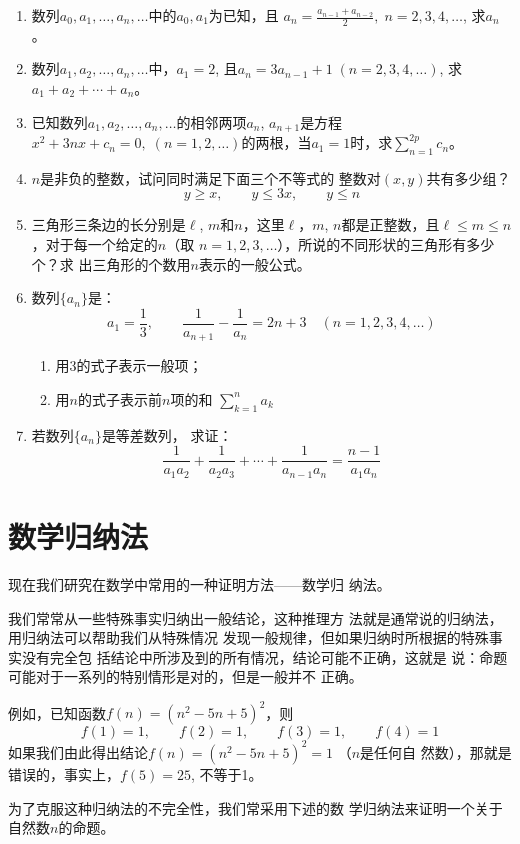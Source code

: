 \begin{enumerate}
\item 数列$a_0,a_1,\ldots, a_n,\ldots$中的$a_0,a_1$为已知，且
$a_n=\frac{a_{n-1}+a_{n-2}}{2},\; n=2,3,4,\ldots$, 求$a_n$。

\item 数列$a_1,a_2,\ldots,a_n,\ldots$中，$a_1=2$, 且$a_n=3a_{n-1}+1\; (n=2,3,4,\ldots )$, 求$a_1+a_2+\cdots +a_n$。
\item 已知数列$a_1,a_2,\ldots ,a_n,\ldots$的相邻两项$a_n$,
$a_{n+1}$是方程$x^2+3nx+c_n=0,\; (n=1,2,\ldots)$的两根，当$a_1=
1$时，求$\sum^{2p}_{n=1}c_n$。
\item $n$是非负的整数，试问同时满足下面三个不等式的
整数对$(x,y)$共有多少组？
\[y\ge x,\qquad y\le 3x,\qquad y\le n\]
\item 三角形三条边的长分别是$\ell$, $m$和$n$，这里$\ell$，$m$,
$n$都是正整数，且$\ell\le m\le n$，对于每一个给定的$n$（取
$n=1,2,3,\ldots$），所说的不同形状的三角形有多少个？求
出三角形的个数用$n$表示的一般公式。
\item 数列$\{a_n\}$是：
\[a_1=\frac{1}{3},\qquad \frac{1}{a_{n+1}}-\frac{1}{a_n}=2n+3\quad (n=1,2,3,4,\ldots)\]
\begin{enumerate}
    \item 用3的式子表示一般项；
    \item 用$n$的式子表示前$n$项的和 $\displaystyle\sum^n_{k=1}a_k$
\end{enumerate}

\item 若数列$\{a_n\}$是等差数列，
求证：\[\frac{1}{a_1a_2}+\frac{1}{a_2a_3}+\cdots+\frac{1}{a_{n-1}a_n}=\frac{n-1}{a_1a_n}\]
\end{enumerate}

\section{数学归纳法}
现在我们研究在数学中常用的一种证明方法——数学归
纳法。

我们常常从一些特殊事实归纳出一般结论，这种推理方
法就是通常说的归纳法，用归纳法可以帮助我们从特殊情况
发现一般规律，但如果归纳时所根据的特殊事实没有完全包
括结论中所涉及到的所有情况，结论可能不正确，这就是
说：命题可能对于一系列的特别情形是对的，但是一般并不
正确。

例如，已知函数$f(n)=(n^2-5n+5)^2$，则
\[f(1)=1,\qquad f(2)=1,\qquad f(3)=1,\qquad f(4)=1 \]
如果我们由此得出结论$f(n)=(n^2-5n+5)^2=1$ （$n$是任何自
然数），那就是错误的，事实上，$f(5)=25$, 不等于1。

为了克服这种归纳法的不完全性，我们常采用下述的数
学归纳法来证明一个关于自然数$n$的命题。

